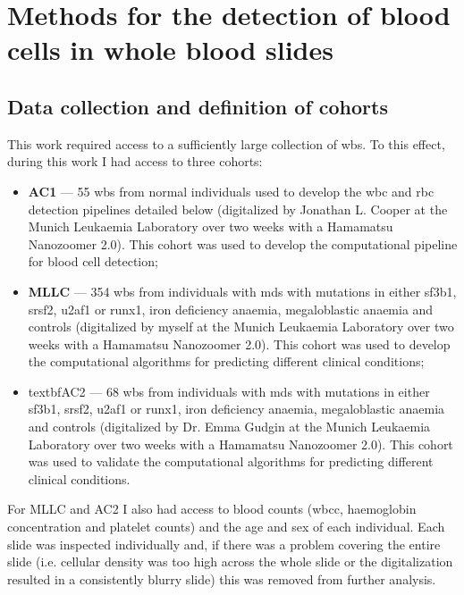 \section{Methods for the detection of blood cells in whole blood slides}

\subsection{Data collection and definition of cohorts}

This work required access to a sufficiently large collection of \ac{wbs}. To this effect, during this work I had access to three cohorts:

\begin{itemize}
    \item \textbf{AC1} --- 55 \ac{wbs} from normal individuals used to develop the \ac{wbc} and \ac{rbc} detection pipelines detailed below (digitalized by Jonathan L. Cooper at the Munich Leukaemia Laboratory over two weeks with a Hamamatsu Nanozoomer 2.0). This cohort was used to develop the computational pipeline for blood cell detection;
    \item \textbf{MLLC} --- 354 \ac{wbs} from individuals with \ac{mds} with mutations in either \ac{sf3b1}, \ac{srsf2}, \ac{u2af1} or \ac{runx1}, iron deficiency anaemia, megaloblastic anaemia and controls (digitalized by myself at the Munich Leukaemia Laboratory over two weeks with a Hamamatsu Nanozoomer 2.0). This cohort was used to develop the computational algorithms for predicting different clinical conditions;
    \item textbf{AC2} --- 68 \ac{wbs} from individuals with \ac{mds} with mutations in either \ac{sf3b1}, \ac{srsf2}, \ac{u2af1} or \ac{runx1}, iron deficiency anaemia, megaloblastic anaemia and controls (digitalized by Dr. Emma Gudgin at the Munich Leukaemia Laboratory over two weeks with a Hamamatsu Nanozoomer 2.0). This cohort was used to validate the computational algorithms for predicting different clinical conditions.
\end{itemize}

For MLLC and AC2 I also had access to blood counts (\ac{wbcc}, haemoglobin concentration and platelet counts) and the age and sex of each individual. Each slide was inspected individually and, if there was a problem covering the entire slide (i.e. cellular density was too high across the whole slide or the digitalization resulted in a consistently blurry slide) this was removed from further analysis.

